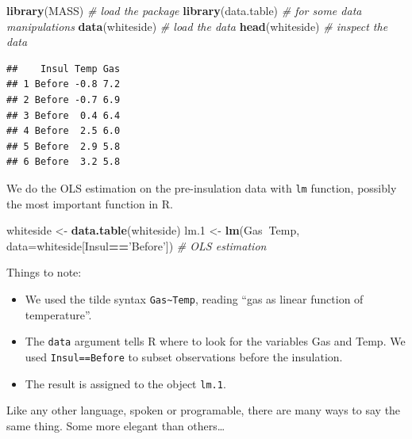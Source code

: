 \documentclass[]{book}
\newenvironment{Shaded}{\begin{snugshade}}{\end{snugshade}}
\newcommand{\KeywordTok}[1]{\textcolor[rgb]{0.13,0.29,0.53}{\textbf{#1}}}
\newcommand{\DataTypeTok}[1]{\textcolor[rgb]{0.13,0.29,0.53}{#1}}
\newcommand{\DecValTok}[1]{\textcolor[rgb]{0.00,0.00,0.81}{#1}}
\newcommand{\StringTok}[1]{\textcolor[rgb]{0.31,0.60,0.02}{#1}}
\newcommand{\CommentTok}[1]{\textcolor[rgb]{0.56,0.35,0.01}{\textit{#1}}}
\newcommand{\OperatorTok}[1]{\textcolor[rgb]{0.81,0.36,0.00}{\textbf{#1}}}
\newcommand{\NormalTok}[1]{#1}
\providecommand{\tightlist}{%
  \setlength{\itemsep}{0pt}\setlength{\parskip}{0pt}}
\theoremstyle{definition}
\theoremstyle{definition}
\theoremstyle{definition}
\theoremstyle{remark}
\begin{document}
\begin{Shaded}
\begin{Highlighting}[]
\KeywordTok{library}\NormalTok{(MASS) }\CommentTok{# load the package}
\KeywordTok{library}\NormalTok{(data.table) }\CommentTok{# for some data manipulations}
\KeywordTok{data}\NormalTok{(whiteside) }\CommentTok{# load the data}
\KeywordTok{head}\NormalTok{(whiteside) }\CommentTok{# inspect the data}
\end{Highlighting}
\end{Shaded}

\begin{verbatim}
##    Insul Temp Gas
## 1 Before -0.8 7.2
## 2 Before -0.7 6.9
## 3 Before  0.4 6.4
## 4 Before  2.5 6.0
## 5 Before  2.9 5.8
## 6 Before  3.2 5.8
\end{verbatim}

We do the OLS estimation on the pre-insulation data with \texttt{lm}
function, possibly the most important function in R.

\begin{Shaded}
\begin{Highlighting}[]
\NormalTok{whiteside <-}\StringTok{ }\KeywordTok{data.table}\NormalTok{(whiteside)}
\NormalTok{lm.}\DecValTok{1}\NormalTok{ <-}\StringTok{ }\KeywordTok{lm}\NormalTok{(Gas}\OperatorTok{~}\NormalTok{Temp, }\DataTypeTok{data=}\NormalTok{whiteside[Insul}\OperatorTok{==}\StringTok{'Before'}\NormalTok{]) }\CommentTok{# OLS estimation }
\end{Highlighting}
\end{Shaded}

Things to note:

\begin{itemize}
\tightlist
\item
  We used the tilde syntax \texttt{Gas\textasciitilde{}Temp}, reading
  ``gas as linear function of temperature''.
\item
  The \texttt{data} argument tells R where to look for the variables Gas
  and Temp. We used
  \texttt{Insul==\textquotesingle{}Before\textquotesingle{}} to subset
  observations before the insulation.
\item
  The result is assigned to the object \texttt{lm.1}.
\end{itemize}

Like any other language, spoken or programable, there are many ways to
say the same thing. Some more elegant than others\ldots{}
\end{document}
